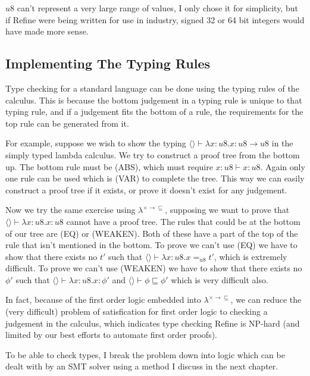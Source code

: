 $u8$ can't represent a very large range of values, I only chose it for simplicity, but if Refine
were being written for use in industry, signed 32 or 64 bit integers would have made more sense.

\subsection{Implementing The Typing Rules}

Type checking for a standard language can be done using the typing rules of the calculus.
This is because the bottom judgement in a typing rule is unique to that typing rule, and if a judgement
fits the bottom of a rule, the requirements for the top rule can be generated from it.

For example, suppose we wish to show the typing $\langle \rangle \vdash \lambda x: u8 . x: u8 \rightarrow u8$
in the simply typed lambda calculus.
We try to construct a proof tree from the bottom up.
The bottom rule must be (ABS), which must require $x:u8 \vdash x : u8$.
Again only one rule can be used which is (VAR) to complete the tree.
This way we can easily construct a proof tree if it exists, or prove it doesn't exist for any judgement.

Now we try the same exercise using $\lambda^{\times \rightarrow \sqsubseteq}$,
supposing we want to prove that $\langle \rangle \vdash \lambda x: u8 . x : u8$ cannot have a proof tree.
The rules that could be at the bottom of our tree are (EQ) or (WEAKEN).
Both of these have a part of the top of the rule that isn't mentioned in the bottom.
To prove we can't use (EQ) we have to show that there exists no $t'$ such that
$\langle \rangle \vdash \lambda x: u8 . x =_{u8} t'$, which is extremely difficult.
To prove we can't use (WEAKEN) we have to show that there exists no $\phi'$ such that
$\langle \rangle \vdash \lambda x: u8 . x : \phi'$ and $\langle \rangle \vdash \phi \sqsubseteq \phi'$
which is very difficult also.

In fact, because of the first order logic embedded into
$\lambda^{\times \rightarrow \sqsubseteq}$, we can reduce the (very difficult)
problem of satisfication for first order logic to checking a judgement in the calculus, which
indicates type checking Refine is NP-hard (and limited by our best efforts to automate first order proofs).

To be able to check types, I break the problem down into logic which can be dealt with by an SMT
solver using a method I discuss in the next chapter.

